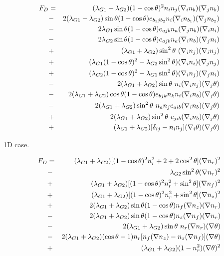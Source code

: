 \documentclass[a4paper]{article}
\begin{document}
\eject



\def\lga{\lambda_{G1}}
\def\lgb{\lambda_{G2}}
\def\lgs{(\lambda_{G1}+\lambda_{G2})}
\def\lgd{(\lambda_{G1}-\lambda_{G2})}

\begin{eqnarray*}
F_D
&=& \lgs(1-\ct)^2 n_i n_j   (\nabla_i n_b)(\nabla_j n_b)\\
%
&-& 2\lgd\st(1-\ct) e_{b_1jb_2} n_i  (\nabla_i n_{b_1})(\nabla_j n_{b_2})\\
&-& 2\lga\st(1-\ct) e_{ajb} n_a (\nabla_j n_b)(\nabla_i n_i)\\
&-& 2\lgb\st(1-\ct) e_{ajb} n_a (\nabla_i n_b)(\nabla_j n_i)\\
%
&+& \lgs\sts\                  (\nabla_i n_j)(\nabla_i n_j)\\
&+& (\lga(1-\ct)^2-\lgb\sts)  (\nabla_i n_i)(\nabla_j n_j)\\
&+& (\lgb(1-\ct)^2-\lga\sts)  (\nabla_i n_j)(\nabla_j n_i)\\
%
&-& 2\lgs\st\ n_i  (\nabla_i n_j)(\nabla_j \theta)\\
&-& 2\lgs\ct(1-\ct) e_{bjk} n_k n_i (\nabla_i n_b)(\nabla_j \theta)\\
&-& 2\lgs\sts\ n_a n_j e_{aib} (\nabla_i n_b)(\nabla_j \theta)\\
&+& 2\lgs\sts\ e_{jib} (\nabla_i n_b)(\nabla_j \theta)\\
%
&+& \lgs[\delta_{ij} - n_i n_j] (\nabla_i \theta) (\nabla_j \theta)\\
\end{eqnarray*}


1D case.

\begin{eqnarray*}
F_D
&=&\lgs[(1-\ct)^2 n_r^2 + 2 + 2\cts]  (\nabla n_r)^2\\
&-& \lgb\sts  (\nabla n_r)^2\\
&+&\lgs[(1-\ct)^2 n_r^2 + \sts]  (\nabla n_f)^2\\
&+&\lgs[(1-\ct)^2 n_r^2 + \sts]  (\nabla n_z)^2\\
%
&+& 2\lgs\st(1-\ct) n_f (\nabla n_z)(\nabla n_r)\\
&-& 2\lgs\st(1-\ct) n_z (\nabla n_f)(\nabla n_r)\\
%
&-& 2\lgs\st\ n_r  (\nabla n_r)(\nabla \theta)\\
&-& 2\lgs(\ct - 1) n_r [n_f (\nabla n_z) - n_z (\nabla n_f) ](\nabla \theta)\\
%
&+& \lgs(1 - n_r^2) (\nabla \theta)^2\\
\end{eqnarray*}
\end{document}
